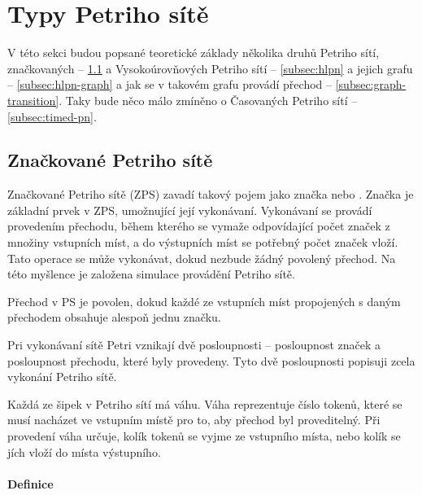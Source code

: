 \section{Typy Petriho sítě}

V této sekci budou popsané teoretické základy několika druhů Petriho sítí, značkovaných -- \ref{subsec:marked-pn} a Vysokoúrovňových Petriho sítí -- \ref{subsec:hlpn} a jejich grafu -- \ref{subsec:hlpn-graph} a jak se v takovém grafu provádí přechod -- \ref{subsec:graph-transition}. Taky bude něco málo zmíněno o Časovaných Petriho sítí -- \ref{subsec:timed-pn}.

\subsection{Značkované Petriho sítě}
\label{subsec:marked-pn}
Značkované Petriho sítě (ZPS) zavadí takový pojem jako značka nebo . Značka je základní prvek v ZPS, umožnující její vykonávaní. Vykonávaní se provádí provedením přechodu, během kterého se vymaže odpovídající počet značek z množiny vstupních míst, a do výstupních míst se potřebný počet značek vloží. Tato operace se může vykonávat, dokud nezbude žádný povolený přechod. Na této myšlence je založena simulace provádění Petriho sítě.

Přechod v PS je povolen, dokud každé ze vstupních míst propojených s daným přechodem obsahuje alespoň jednu značku.

Pri vykonávaní sítě Petri vznikají dvě posloupnosti -- posloupnost značek a posloupnost přechodu, které byly provedeny. Tyto dvě posloupnosti popisuji zcela vykonání Petriho sítě. \cite[p.18--19]{PNandMoS}

Každá ze šipek v Petriho sítí má váhu. Váha reprezentuje číslo tokenů, které se musí nacházet ve vstupním místě pro to, aby přechod byl proveditelný. Při provedení váha určuje, kolík tokenů se vyjme ze vstupního místa, nebo kolík se jích vloží do místa výstupního.

\paragraph{Definice}

